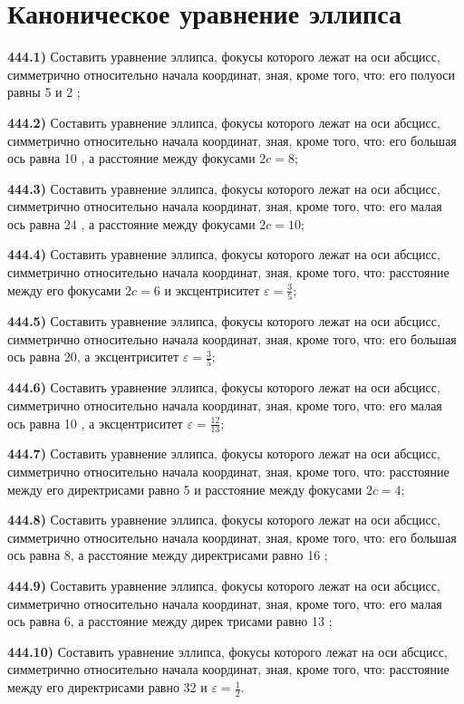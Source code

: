 \section{Каноническое уравнение эллипса}



\textbf{444.1)} Составить уравнение эллипса, фокусы которого лежат на оси абсцисс, симметрично относительно начала координат, зная, кроме того, что: его полуоси равны 5 и 2 ;

\textbf{444.2)} Составить уравнение эллипса, фокусы которого лежат на оси абсцисс, симметрично относительно начала координат, зная, кроме того, что: его большая ось равна 10 , а расстояние между фокусами $2 c=8$;

\textbf{444.3)} Составить уравнение эллипса, фокусы которого лежат на оси абсцисс, симметрично относительно начала координат, зная, кроме того, что: его малая ось равна 24 , а расстояние между фокусами $2 c=10$;

\textbf{444.4)} Составить уравнение эллипса, фокусы которого лежат на оси абсцисс, симметрично относительно начала координат, зная, кроме того, что: расстояние между его фокусами $2 c=6$ и эксцентриситет $\varepsilon=\frac{3}{5}$;

\textbf{444.5)} Составить уравнение эллипса, фокусы которого лежат на оси абсцисс, симметрично относительно начала координат, зная, кроме того, что: его большая ось равна 20, а эксцентриситет $\varepsilon=\frac{3}{5}$;

\textbf{444.6)} Составить уравнение эллипса, фокусы которого лежат на оси абсцисс, симметрично относительно начала координат, зная, кроме того, что: его малая ось равна 10 , а эксцентриситет $\varepsilon=\frac{12}{13}$;

\textbf{444.7)} Составить уравнение эллипса, фокусы которого лежат на оси абсцисс, симметрично относительно начала координат, зная, кроме того, что: расстояние между его директрисами равно 5 и расстояние между фокусами $2 c=4$;

\textbf{444.8)} Составить уравнение эллипса, фокусы которого лежат на оси абсцисс, симметрично относительно начала координат, зная, кроме того, что: его большая ось равна 8, а расстояние между директрисами равно 16 ;

\textbf{444.9)} Составить уравнение эллипса, фокусы которого лежат на оси абсцисс, симметрично относительно начала координат, зная, кроме того, что: его малая ось равна 6, а расстояние между дирек трисами равно 13 ;

\textbf{444.10)} Составить уравнение эллипса, фокусы которого лежат на оси абсцисс, симметрично относительно начала координат, зная, кроме того, что: расстояние между его директрисами равно 32 и $\varepsilon=\frac{1}{2}$.

